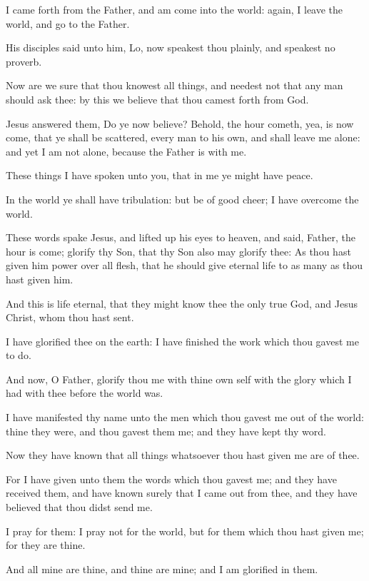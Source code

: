 \Verse I came forth from the Father, and am come into the world: again, I leave the world, and go to the Father.

\Verse His disciples said unto him, Lo, now speakest thou plainly, and speakest no proverb.

\Verse Now are we sure that thou knowest all things, and needest not that any man should ask thee: by this we believe that thou camest forth from God.

\Verse Jesus answered them, Do ye now believe?  \Verse Behold, the hour cometh, yea, is now come, that ye shall be scattered, every man to his own, and shall leave me alone: and yet I am not alone, because the Father is with me.

\Verse These things I have spoken unto you, that in me ye might have peace.

In the world ye shall have tribulation: but be of good cheer; I have overcome the world.


\Chapter
\Verse These words spake Jesus, and lifted up his eyes to heaven, and said, Father, the hour is come; glorify thy Son, that thy Son also may glorify thee: \Verse As thou hast given him power over all flesh, that he should give eternal life to as many as thou hast given him.

\Verse And this is life eternal, that they might know thee the only true God, and Jesus Christ, whom thou hast sent.

\Verse I have glorified thee on the earth: I have finished the work which thou gavest me to do.

\Verse And now, O Father, glorify thou me with thine own self with the glory which I had with thee before the world was.

\Verse I have manifested thy name unto the men which thou gavest me out of the world: thine they were, and thou gavest them me; and they have kept thy word.

\Verse Now they have known that all things whatsoever thou hast given me are of thee.

\Verse For I have given unto them the words which thou gavest me; and they have received them, and have known surely that I came out from thee, and they have believed that thou didst send me.

\Verse I pray for them: I pray not for the world, but for them which thou hast given me; for they are thine.

\Verse And all mine are thine, and thine are mine; and I am glorified in them.

